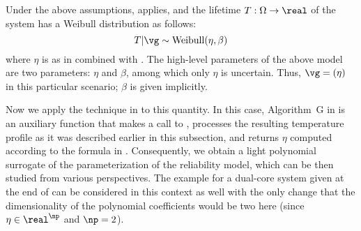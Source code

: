 Under the above assumptions,  applies, and the
lifetime $T: \Omega \to \real$ of the system has a Weibull distribution as
follows:
\[
  T | \vg \sim \mathrm{Weibull}(\eta, \beta)
\]
where $\eta$ is as in  combined with
. The high-level parameters of the above model are
two parameters: $\eta$ and $\beta$, among which only $\eta$ is uncertain.
Thus, $\vg = (\eta)$ in this particular scenario; $\beta$ is given implicitly.

Now we apply the technique in  to this quantity. In
this case, Algorithm~G in  is an auxiliary function
that makes a call to , processes the resulting
temperature profile as it was described earlier in this subsection, and returns
$\eta$ computed according to the formula in .
Consequently, we obtain a light polynomial surrogate of the parameterization of
the reliability model, which can be then studied from various perspectives. The
example for a dual-core system given at the end of 
can be considered in this context as well with the only change that the
dimensionality of the polynomial coefficients would be two here (since $\eta \in
\real^\np$ and $\np = 2$).
